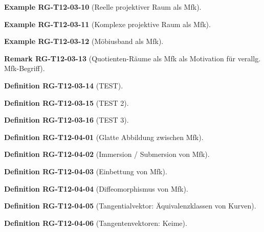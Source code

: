 \documentclass[10pt, letterpaper]{article}
\newcommand{\CustomHeading}[3]{%
  \par\medskip\noindent%
  \textbf{#1 #2} \textnormal{(#3)}.\enskip%
}
\newenvironment{DEF}[2]{\CustomHeading{Definition}{#1}{#2}}{}
\newenvironment{REM}[2]{\CustomHeading{Remark}{#1}{#2}}{}
\newenvironment{EXA}[2]{\CustomHeading{Example}{#1}{#2}}{}
\begin{document}
\begin{EXA}{RG-T12-03-10}{Reelle projektiver Raum als Mfk}
\end{EXA}

\begin{EXA}{RG-T12-03-11}{Komplexe projektive Raum als Mfk}
\end{EXA}

\begin{EXA}{RG-T12-03-12}{Möbiusband als Mfk}
\end{EXA}

\begin{REM}{RG-T12-03-13}{Quotienten-Räume als Mfk als Motivation für verallg. Mfk-Begriff}
\end{REM}

\begin{DEF}{RG-T12-03-14}{TEST}
\end{DEF}

\begin{DEF}{RG-T12-03-15}{TEST 2}
\end{DEF}

\begin{DEF}{RG-T12-03-16}{TEST 3}
\end{DEF}

\begin{DEF}{RG-T12-04-01}{Glatte Abbildung zwischen Mfk}
\end{DEF}

\begin{DEF}{RG-T12-04-02}{Immersion / Submersion von Mfk}
\end{DEF}

\begin{DEF}{RG-T12-04-03}{Einbettung von Mfk}
\end{DEF}

\begin{DEF}{RG-T12-04-04}{Diffeomorphismus von Mfk}
\end{DEF}

\begin{DEF}{RG-T12-04-05}{Tangentialvektor: Äquivalenzklassen von Kurven}
\end{DEF}

\begin{DEF}{RG-T12-04-06}{Tangentenvektoren: Keime}
\end{DEF}
\end{document}
